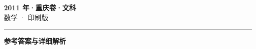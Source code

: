 \documentclass[zihao=5, a4paper]{ctexart}
\begin{document}
\begin{center}
  {\Large\bfseries 2011 年·重庆卷·文科}\\[4pt]
  {\large 数学 · 印刷版}
\end{center}
\medskip
{}

\par\bigskip\hrule\bigskip
{}
\begin{center}{\large\bfseries 参考答案与详细解析}\end{center}
\smallskip

\end{document}
